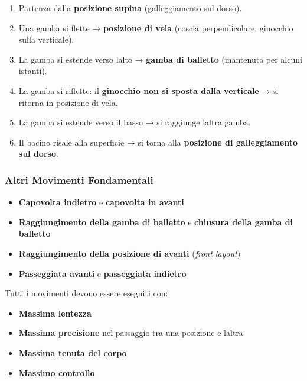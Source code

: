 \documentclass[a4paper,11pt]{article}
\providecommand{\tightlist}{%
  \setlength{\itemsep}{0pt}\setlength{\parskip}{0pt}}
\begin{document}
\begin{enumerate}
      \tightlist
      \item
            Partenza dalla \textbf{posizione supina} (galleggiamento sul dorso).
      \item
            Una gamba si flette → \textbf{posizione di vela} (coscia
            perpendicolare, ginocchio sulla verticale).
      \item
            La gamba si estende verso l\textquotesingle alto → \textbf{gamba di
                  balletto} (mantenuta per alcuni istanti).
      \item
            La gamba si riflette: il \textbf{ginocchio non si sposta dalla
                  verticale} → si ritorna in posizione di vela.
      \item
            La gamba si estende verso il basso → si raggiunge
            l\textquotesingle altra gamba.
      \item
            Il bacino risale alla superficie → si torna alla \textbf{posizione di
                  galleggiamento sul dorso}.
\end{enumerate}

\subsubsection{Altri Movimenti
      Fondamentali}\label{altri-movimenti-fondamentali}

\begin{itemize}
      \tightlist
      \item
            \textbf{Capovolta indietro} e \textbf{capovolta in avanti}
      \item
            \textbf{Raggiungimento della gamba di balletto} e \textbf{chiusura
                  della gamba di balletto}
      \item
            \textbf{Raggiungimento della posizione di avanti} (\emph{front
                  layout})
      \item
            \textbf{Passeggiata avanti} e \textbf{passeggiata indietro}
\end{itemize}

Tutti i movimenti devono essere eseguiti con:

\begin{itemize}
      \tightlist
      \item
            \textbf{Massima lentezza}
      \item
            \textbf{Massima precisione} nel passaggio tra una posizione e
            l\textquotesingle altra
      \item
            \textbf{Massima tenuta del corpo}
      \item
            \textbf{Massimo controllo}
\end{itemize}
\end{document}
